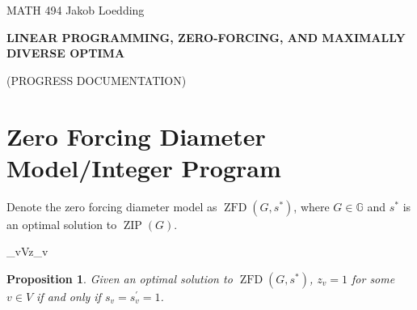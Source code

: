\documentclass{article}
\newcommand\zip[1]{\operatorname{ZIP}\left(#1\right)}
\newcommand\dzf[1]{\operatorname{ZFD}\left(#1\right)}
\newtheorem{proposition}[theorem]{Proposition}
\theoremstyle{definition}
\begin{document}
\noindent
{MATH 494}
\hfill
{
Jakob Loedding}

\vspace{.3 in}

\centerline{\large \bf  L{\small INEAR} P{\small ROGRAMMING,} Z{\small ERO-}F{\small ORCING,} {\small AND} M{\small AXIMALLY} D{\small IVERSE} O{\small PTIMA} }
\vspace{.1 in}
\centerline{\large  (P{\small ROGRESS} D{\small OCUMENTATION})}

\vspace{.2 in}

\section{Zero Forcing Diameter Model/Integer Program}\label{sec:intro}
Denote the zero forcing diameter model as $\dzf{G,s^{*}}$, where $G \in \mathbb{G}$ and $s^{*}$ is an optimal solution to $\zip{G}$.

\begin{mini!}
	{}{\sum_{v\in V}z_{v}}{}{}\label{eq:zfip-obj}
	\label{eq:zfip-const1}
	\label{eq:zfip-const2}
	\label{eq:zfip-const3}
	\label{eq:zfip-const4}
	\label{eq:zfip-const5}
	\label{eq:zfip-const6}
	\label{eq:zfip-const7}
	\label{eq:zfip-const8}
	\label{eq:zfip-const9}
	\label{eq:zfip-const10}
\end{mini!} 

\begin{proposition}
Given an optimal solution to $\dzf{G,s^{*}}$, $z_v = 1$ for some $v \in V$ if and only if $s_v = s_v^{'} = 1$.
\end{proposition}
\end{document}
